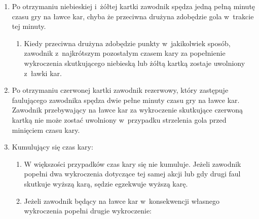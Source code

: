 \documentclass[12pt,a4paper]{article}
\begin{document}
\begin{enumerate}
	\item Po otrzymaniu niebieskiej i~żółtej kartki zawodnik spędza jedną
	      pełną minutę czasu gry na ławce kar, chyba że przeciwna drużyna
	      zdobędzie gola w~trakcie tej minuty.

	      \begin{enumerate}
		      \item
		            Kiedy przeciwna drużyna zdobędzie punkty w~jakikolwiek sposób,
		            zawodnik z~najkrótszym pozostałym czasem kary za popełnienie
		            wykroczenia skutkującego niebieską lub żółtą kartką zostaje
		            uwolniony z~ławki kar.
	      \end{enumerate}
	\item
	      Po otrzymaniu czerwonej kartki zawodnik rezerwowy, który zastępuje
	      faulującego zawodnika spędza dwie pełne minuty czasu gry na ławce kar.
	      Zawodnik przebywający na ławce kar za wykroczenie skutkujące czerwoną
	      kartką nie może zostać uwolniony w~przypadku strzelenia gola przed
	      minięciem czasu kary.
	\item
	      Kumulujący się czas kary:

	      \begin{enumerate}
		      \item
		            W większości przypadków czas kary się nie kumuluje. Jeżeli zawodnik
		            popełni dwa wykroczenia dotyczące tej samej akcji lub gdy drugi faul
		            skutkuje wyższą karą, sędzie egzekwuje wyższą karę.
		      \item
		            Jeżeli zawodnik będący na ławce kar w~konsekwencji własnego
		            wykroczenia popełni drugie wykroczenie:


\end{enumerate}
\end{enumerate}
\end{document}
